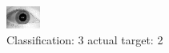 \begin{figure}[h!]
\begin{center}
\includegraphics[width=0.60\columnwidth]{figures/ID1790_class_3_target_2.png}
\end{center}
\caption{ Classification: 3 actual target: 2}
\label{fig:ID1790_class_3_target_2}
\end{figure}

